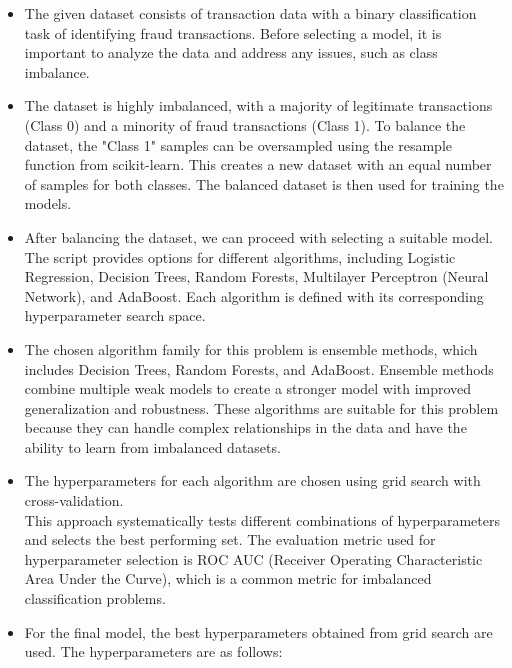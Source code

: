 \documentclass[a4, 10 pt, conference]{ieeeconf}  %
\begin{document}
{\color{black}

\begin{itemize} \textbfn
	\item The given dataset consists of transaction data with a binary classification task of identifying fraud transactions. Before selecting a model, it is important to analyze the data and address any issues, such as class imbalance.

	\item The dataset is highly imbalanced, with a majority of legitimate transactions (Class 0) and a minority of fraud transactions (Class 1). To balance the dataset, the "Class 1" samples can be oversampled using the resample function from scikit-learn. This creates a new dataset with an equal number of samples for both classes. The balanced dataset is then used for training the models.

	\item After balancing the dataset, we can proceed with selecting a suitable model. The script provides options for different algorithms, including Logistic Regression, Decision Trees, Random Forests, Multilayer Perceptron (Neural Network), and AdaBoost. Each algorithm is defined with its corresponding hyperparameter search space.

	\item The chosen algorithm family for this problem is ensemble methods, which includes Decision Trees, Random Forests, and AdaBoost. Ensemble methods combine multiple weak models to create a stronger model with improved generalization and robustness. These algorithms are suitable for this problem because they can handle complex relationships in the data and have the ability to learn from imbalanced datasets.

	\item The hyperparameters for each algorithm are chosen using grid search with cross-validation. \\[1em] This approach 
	systematically tests different combinations of hyperparameters and selects the best performing set. The evaluation metric used for hyperparameter selection is ROC AUC (Receiver Operating Characteristic Area Under the Curve), which is a common metric for imbalanced classification problems.

	\item For the final model, the best hyperparameters obtained from grid search are used. The hyperparameters are as follows:


\end{itemize}}
\end{document}

